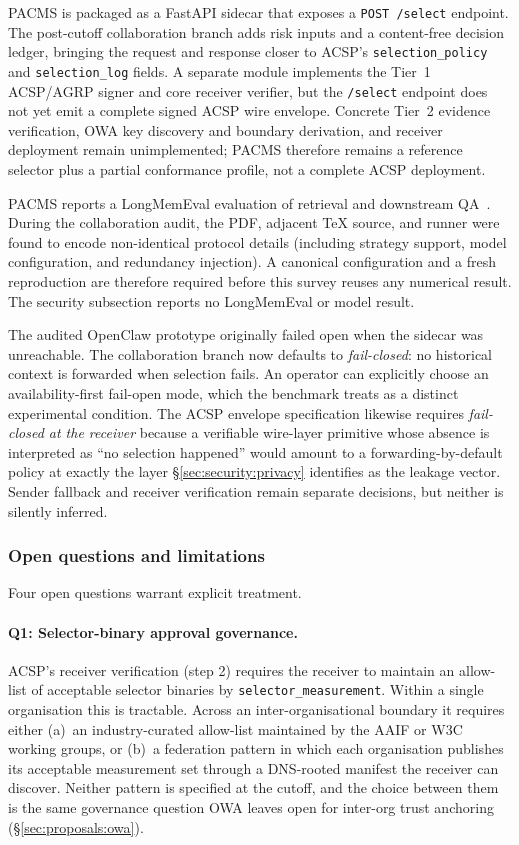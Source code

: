 PACMS is packaged as a FastAPI sidecar that exposes a
\texttt{POST /select} endpoint. The post-cutoff
collaboration branch adds risk inputs and a content-free
decision ledger, bringing the request and response closer
to ACSP's \texttt{selection\_policy} and
\texttt{selection\_log} fields. A separate module implements
the Tier~1 ACSP/AGRP signer and core receiver verifier, but
the \texttt{/select} endpoint does not yet emit a complete
signed ACSP wire envelope. Concrete Tier~2 evidence
verification, OWA key discovery and boundary derivation,
and receiver deployment remain unimplemented; PACMS
therefore remains a reference selector plus a partial
conformance profile, not a complete ACSP deployment.

PACMS reports a LongMemEval evaluation of retrieval and
downstream QA~\cite{pacms_cikm_demo}. During the
collaboration audit, the PDF, adjacent TeX source, and
runner were found to encode non-identical protocol details
(including strategy support, model configuration, and
redundancy injection). A canonical configuration and a
fresh reproduction are therefore required before this
survey reuses any numerical result. The security subsection
reports no LongMemEval or model result.

The audited OpenClaw prototype originally failed open when
the sidecar was unreachable. The collaboration branch now
defaults to \emph{fail-closed}: no historical context is
forwarded when selection fails. An operator can explicitly
choose an availability-first fail-open mode, which the
benchmark treats as a distinct experimental condition.
The ACSP envelope specification likewise requires
\emph{fail-closed at the receiver}
because a verifiable wire-layer primitive whose absence
is interpreted as ``no selection happened'' would amount
to a forwarding-by-default policy at exactly the layer
\S\ref{sec:security:privacy} identifies as the leakage
vector. Sender fallback and receiver verification remain
separate decisions, but neither is silently inferred.

\subsubsection{Open questions and limitations}
\label{sec:proposals:acsp:open}

Four open questions warrant explicit treatment.

\paragraph{Q1: Selector-binary approval governance.}
ACSP's receiver verification (step 2) requires the
receiver to maintain an allow-list of acceptable
selector binaries by \texttt{selector\_measurement}.
Within a single organisation this is tractable. Across
an inter-organisational boundary it requires either
(a)~an industry-curated allow-list maintained by the
AAIF or W3C working groups, or (b)~a federation pattern
in which each organisation publishes its acceptable
measurement set through a DNS-rooted manifest the
receiver can discover. Neither pattern is specified at
the cutoff, and the choice between them is the same
governance question OWA leaves open for inter-org trust
anchoring (\S\ref{sec:proposals:owa}).

